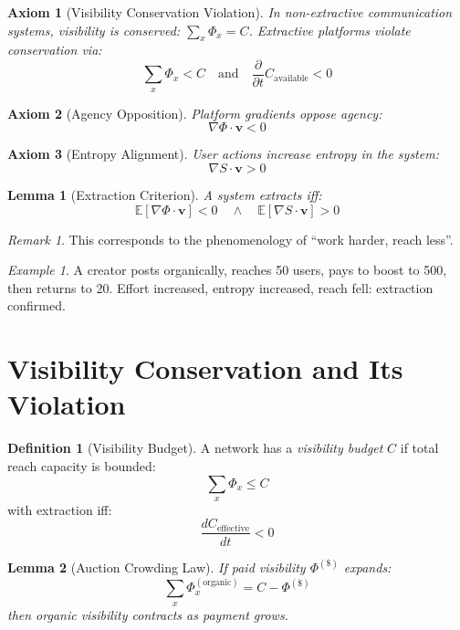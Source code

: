 \documentclass[11pt,a4paper]{article}
\theoremstyle{plain}
\newtheorem{lemma}{Lemma}[section]
\newtheorem{axiom}{Axiom}[section]
\theoremstyle{definition}
\newtheorem{definition}{Definition}[section]
\theoremstyle{remark}
\newtheorem{remark}{Remark}[section]
\newtheorem{example}{Example}[section]
\newcommand{\vvec}{\mathbf{v}}
\newcommand{\Entropy}{S}
\begin{document}
\begin{axiom}[Visibility Conservation Violation]
In non-extractive communication systems, visibility is conserved:
$\sum_x \Phi_x = C$.
Extractive platforms violate conservation via:
\[
\sum_x \Phi_x < C \quad \text{and} \quad \frac{\partial}{\partial t} C_{\text{available}} < 0
\]
\end{axiom}

\begin{axiom}[Agency Opposition]
Platform gradients oppose agency:
\[
\nabla \Phi \cdot \vvec < 0
\]
\end{axiom}

\begin{axiom}[Entropy Alignment]
User actions increase entropy in the system:
\[
\nabla \Entropy \cdot \vvec > 0
\]
\end{axiom}

\begin{lemma}[Extraction Criterion]
A system extracts iff:
\[
\mathbb{E}[\nabla \Phi \cdot \vvec] < 0 \quad \wedge \quad \mathbb{E}[\nabla\Entropy \cdot \vvec] > 0
\]
\end{lemma}

\begin{remark}
This corresponds to the phenomenology of ``work harder, reach less''.
\end{remark}

\begin{example}
A creator posts organically, reaches 50 users, pays to boost to 500, then returns to 20.  
Effort increased, entropy increased, reach fell: extraction confirmed.
\end{example}

\section{Visibility Conservation and Its Violation}

\begin{definition}[Visibility Budget]
A network has a \emph{visibility budget} $C$ if total reach capacity is bounded:
\[
\sum_x \Phi_x \le C
\]
with extraction iff:
\[
\frac{dC_{\text{effective}}}{dt} < 0
\]
\end{definition}

\begin{lemma}[Auction Crowding Law]
If paid visibility $\Phi^{(\$)}$ expands:
\[
\sum_x \Phi_x^{(\text{organic})} = C - \Phi^{(\$)}
\]
then organic visibility contracts as payment grows.
\end{lemma}
\end{document}
